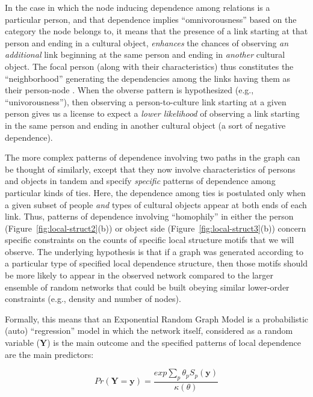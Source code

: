 \documentclass[preprint,12pt,authoryear]{elsarticle}
\begin{document}
In the case in which the node inducing dependence among relations is a particular person, and that dependence implies ``omnivorousness'' based on the category the node belongs to, it means that the presence of a link starting at that person and ending in a cultural object, \textit{enhances} the chances of observing \textit{an additional} link beginning at the same person and ending in \textit{another} cultural object. The focal person (along with their characteristics) thus constitutes the ``neighborhood'' generating the dependencies among the links having them as their person-node \citep{pattison2002neighborhood}. When the obverse pattern is hypothesized (e.g., ``univorousness''), then observing a person-to-culture link starting at a given person gives us a license to expect a \textit{lower likelihood} of observing a link starting in the same person and ending in another cultural object (a sort of negative dependence). 

The more complex patterns of dependence involving two paths in the graph can be thought of similarly, except that they now involve characteristics of persons and objects in tandem and specify \textit{specific} patterns of dependence among particular kinds of ties. Here, the dependence among ties is postulated only when a given subset of people \textit{and} types of cultural objects appear at both ends of each link. Thus, patterns of dependence involving ``homophily'' in either the person (Figure~\ref{fig:local-struct2}(b)) or object side (Figure~\ref{fig:local-struct3}(b)) concern specific constraints on the counts of specific local structure motifs that we will observe. The underlying hypothesis is that if a graph was generated according to a particular type of specified local dependence structure, then those motifs should be more likely to appear in the observed network compared to the larger ensemble of random networks that could be built obeying similar lower-order constraints (e.g., density and number of nodes). 

Formally, this means that an Exponential Random Graph Model is a probabilistic (auto) ``regression'' model in which the network itself, considered as a random variable ($\mathbf{Y}$) is the main outcome and the specified patterns of local dependence are the main predictors:

\begin{equation}
    Pr(\mathbf{Y} = \mathbf{y}) = \frac{exp\sum_p \theta_p S_p(\mathbf{y})}{\kappa(\theta)}
\end{equation}
\end{document}
